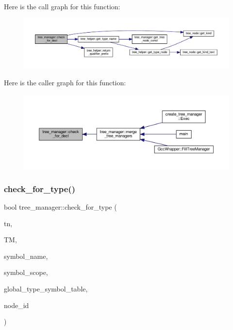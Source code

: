 Here is the call graph for this function\+:
\nopagebreak
\begin{figure}[H]
\begin{center}
\leavevmode
\includegraphics[width=350pt]{d2/ddd/classtree__manager_a49d8c695d4e28fd1276bb00b068a000a_cgraph}
\end{center}
\end{figure}
Here is the caller graph for this function\+:
\nopagebreak
\begin{figure}[H]
\begin{center}
\leavevmode
\includegraphics[width=350pt]{d2/ddd/classtree__manager_a49d8c695d4e28fd1276bb00b068a000a_icgraph}
\end{center}
\end{figure}
\mbox{\label{classtree__manager_ab5b9cbb2138f1682ff6c3f5c4650562e}} 
\subsubsection{\texorpdfstring{check\+\_\+for\+\_\+type()}{check\_for\_type()}}
{\footnotesize\ttfamily bool tree\+\_\+manager\+::check\+\_\+for\+\_\+type (\begin{DoxyParamCaption}\item[{const \hyperlink{tree__node_8hpp_a6ee377554d1c4871ad66a337eaa67fd5}{tree\+\_\+node\+Ref} \&}]{tn,  }\item[{const \hyperlink{tree__manager_8hpp_a96ff150c071ce11a9a7a1e40590f205e}{tree\+\_\+manager\+Ref} \&}]{TM,  }\item[{std\+::string \&}]{symbol\+\_\+name,  }\item[{std\+::string \&}]{symbol\+\_\+scope,  }\item[{const \hyperlink{custom__map_8hpp_a8cbaceffc09790a885ec7e9c17809c69}{Custom\+Unordered\+Map\+Unstable}$<$ std\+::string, unsigned int $>$ \&}]{global\+\_\+type\+\_\+symbol\+\_\+table,  }\item[{unsigned int}]{node\+\_\+id }\end{DoxyParamCaption})\hspace{0.3cm}{\ttfamily [private]}}



